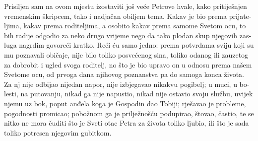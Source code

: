 \documentclass[a5paper,twoside]{article}
\begin{document}
\begin{pages}
\begin{Rightside}
\begin{croatian}
\pend
\pstart
Prisiljen sam na ovom mjestu izostaviti još veće Petrove hvale, kako pritiješnjen vremenskim škripcem, tako i nadjačan obiljem tema.  Kakav je bio prema prijateljima, kakav prema roditeljima, a osobito kakav prema samome Svetom ocu, to bih radije odgodio za neko drugo vrijeme nego da tako plodan skup njegovih zasluga nagrdim govoreći kratko. Reći ću samo jedno: prema potvrdama sviju koji su mu poznavali običaje, nije bilo toliko posvećenog sina, toliko odanog ili zauzetog za dobrobit i ugled svoga roditelj, no što je bio upravo on u odnosu prema našem Svetome ocu, od prvoga dana njihovog poznanstva pa do samoga konca života. Za nj nije odbijao nijedan napor, nije izbjegavao nikakvu pogibelj; u muci, u bolesti, na putovanju, nikad ga nije napustio, nikad nije ostavio svoju službu, uvijek njemu uz bok, poput anđela koga je Gospodin dao Tobiji; rješavao je probleme, pogodnosti promicao; pobožnom ga je prilježnošću podupirao, štovao, častio, te se nitko ne mora čuditi što je Sveti otac Petra za života toliko ljubio, ili što je sada toliko potresen njegovim gubitkom.


\end{croatian}
\end{Rightside}
\end{pages}
\end{document}
